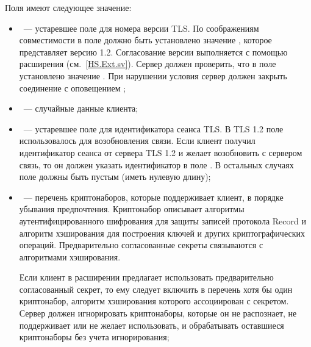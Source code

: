 
Поля  имеют следующее значение:
%
\begin{itemize}
\item
{}~--- устаревшее поле для номера версии TLS. По соображениям
совместимости в поле должно быть установлено значение , которое
представляет версию 1.2. Согласование версии выполняется с помощью расширения
 (см.~\ref{HS.Ext.sv}).
%
Сервер должен проверить, что в поле установлено значение .
При нарушении условия сервер должен закрыть соединение с оповещением 
;

   
\item
{}~--- случайные данные клиента; 



\item
{}~--- устаревшее поле для идентификатора сеанса TLS. 
В TLS 1.2 поле использовалось для возобновления связи.  
%
Если клиент получил идентификатор сеанса от сервера TLS 1.2 и желает 
возобновить с сервером связь, то он должен указать идентификатор в поле 
. 
%
В остальных случаях поле должны быть пустым (иметь нулевую длину);


\item
{}~--- перечень криптонаборов, которые поддерживает клиент, 
в порядке убывания предпочтения. 
%
Криптонабор описывает алгоритмы аутентифицированного шифрования для защиты
записей протокола Record и алгоритм хэширования для построения ключей и других
криптографических операций.
%
Предварительно согласованные секреты связываются с алгоритмами хэширования.

Если клиент в расширении  предлагает
использовать предварительно согласованный секрет, то ему следует включить в
перечень хотя бы один криптонабор, алгоритм хэширования которого ассоциирован с
секретом.
%
Сервер должен игнорировать криптонаборы, которые он не распознает, не
поддерживает или не желает использовать, и обрабатывать оставшиеся криптонаборы
без учета игнорирования;


\end{itemize}
